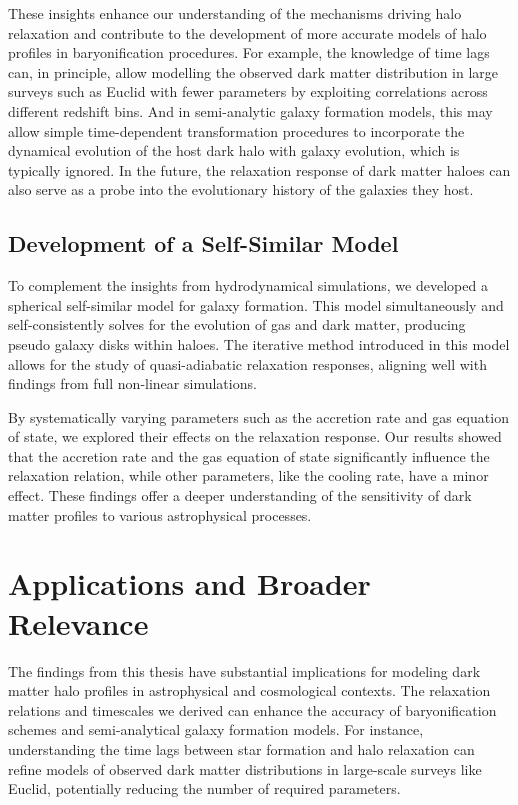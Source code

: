 These insights enhance our understanding of the mechanisms driving halo relaxation and contribute to the development of more accurate models of halo profiles in baryonification procedures.
For example, the knowledge of time lags can, in principle, allow modelling the observed dark matter distribution in large surveys such as Euclid with fewer parameters by exploiting correlations across different redshift bins.
And in semi-analytic galaxy formation models, this may allow simple time-dependent transformation procedures to incorporate the dynamical evolution of the host dark halo with galaxy evolution, which is typically ignored. In the future, the relaxation response of dark matter haloes can also serve as a probe into the evolutionary history of the galaxies they host.

\subsection{Development of a Self-Similar Model}
To complement the insights from hydrodynamical simulations, we developed a spherical self-similar model for galaxy formation. This model simultaneously and self-consistently solves for the evolution of gas and dark matter, producing pseudo galaxy disks within haloes. The iterative method introduced in this model allows for the study of quasi-adiabatic relaxation responses, aligning well with findings from full non-linear simulations.

By systematically varying parameters such as the accretion rate and gas equation of state, we explored their effects on the relaxation response. Our results showed that the accretion rate and the gas equation of state significantly influence the relaxation relation, while other parameters, like the cooling rate, have a minor effect. These findings offer a deeper understanding of the sensitivity of dark matter profiles to various astrophysical processes.

\section{Applications and Broader Relevance}
The findings from this thesis have substantial implications for modeling dark matter halo profiles in astrophysical and cosmological contexts. The relaxation relations and timescales we derived can enhance the accuracy of baryonification schemes and semi-analytical galaxy formation models. For instance, understanding the time lags between star formation and halo relaxation can refine models of observed dark matter distributions in large-scale surveys like Euclid, potentially reducing the number of required parameters.

